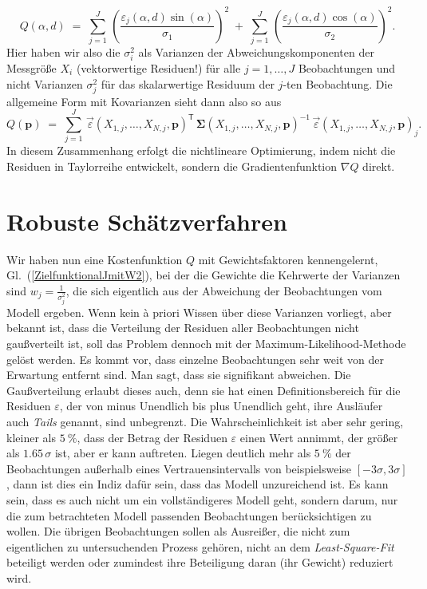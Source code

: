 \begin{equation}
Q(\alpha, d) \; = \;
\sum\limits_{j=1}^J \,  \left(\frac{\varepsilon_j(\alpha, d) \sin(\alpha)}{\sigma_1}\right)^2
\; + \; \sum\limits_{j=1}^J \, \left(\frac{\varepsilon_j(\alpha, d) \cos(\alpha)}{\sigma_2}\right)^2 .
\end{equation}
Hier haben wir also die $\sigma_i^2$ als Varianzen der Abweichungskomponenten
der Messgröße $X_i$ (vektorwertige Residuen!) für alle $j=1,\dots,J$ Beobachtungen
und nicht Varianzen $\sigma_j^2$ für das skalarwertige Residuum der $j$-ten Beobachtung.
Die allgemeine Form mit Kovarianzen sieht dann also so aus
\begin{equation}
Q(\mathbf{p}) \; = \;
 \sum\limits_{j=1}^J \, \vec \varepsilon(X_{1,j},\dots,X_{N,j},\mathbf{p})^\mathsf{T} \, 
\boldsymbol{\Sigma}(X_{1,j},\dots,X_{N,j},\mathbf{p})^{-1} \, \vec \varepsilon(X_{1,j},\dots,X_{N,j},\mathbf{p})_j .
\label{generalLSmethod}
\end{equation}
In diesem Zusammenhang erfolgt die nichtlineare Optimierung, indem nicht
die Residuen in Taylorreihe entwickelt, sondern die Gradientenfunktion $\nabla Q$ direkt.

\section{Robuste Schätzverfahren}
\label{robustEstimation}
Wir haben nun eine Kostenfunktion $Q$ mit Gewichtsfaktoren kennengelernt, Gl.~(\ref{ZielfunktionalJmitW2}),
bei der die Gewichte die Kehrwerte der Varianzen sind $w_j = \frac{1}{\sigma_j^2}$, die sich eigentlich
aus der Abweichung der Beobachtungen vom Modell ergeben. Wenn kein {\`a} priori Wissen über
diese Varianzen vorliegt, aber bekannt ist, dass die Verteilung der
Residuen aller Beobachtungen nicht gauß\-ver\-teilt ist, soll das Problem dennoch mit der
Maximum-Likelihood-Methode gelöst werden. Es kommt vor, dass einzelne Beobachtungen
sehr weit von der Erwartung entfernt sind. Man sagt, dass sie signifikant abweichen. Die Gaußverteilung erlaubt dieses auch, denn sie hat einen Definitionsbereich für die Residuen $\varepsilon$,
der von minus Unendlich bis plus Unendlich geht, ihre Ausläufer auch \textsl{Tails} genannt,
sind unbegrenzt. Die Wahrscheinlichkeit ist aber sehr gering, kleiner als $5~\%$, dass der Betrag der
Residuen $\varepsilon$ einen Wert annimmt, der größer als
$1.65 \, \sigma$ ist, aber er kann auftreten. Liegen deutlich mehr als $5~\%$
der Beobachtungen außerhalb eines Vertrauensintervalls von beispielsweise $[-3 \sigma, 3 \sigma]$,
dann ist dies ein Indiz dafür sein, dass das Modell unzureichend ist. Es kann sein, dass es auch nicht
um ein vollständigeres Modell geht, sondern darum, nur die zum betrachteten Modell passenden Beobachtungen
berücksichtigen zu wollen. Die übrigen Beobachtungen sollen als Ausreißer, die nicht zum
eigentlichen zu untersuchenden Prozess gehören, nicht an dem \textsl{Least-Square-Fit}
beteiligt werden oder zumindest ihre Beteiligung daran (ihr Gewicht) reduziert wird.

